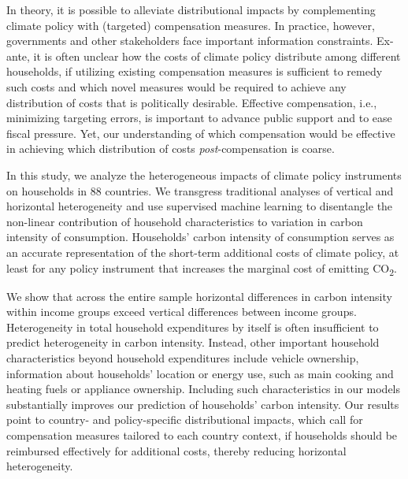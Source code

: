 \documentclass[12pt, a4paper]{article}
\begin{document}
In theory, it is possible to alleviate distributional impacts by complementing climate policy with (targeted) compensation measures. In practice, however, governments and other stakeholders face important information constraints. Ex-ante, it is often unclear how the costs of climate policy distribute among different households, if utilizing existing compensation measures is sufficient to remedy such costs and which novel measures would be required to achieve any distribution of costs that is politically desirable. Effective compensation, i.e., minimizing targeting errors, is important to advance public support and to ease fiscal pressure. Yet, our understanding of which compensation would be effective in achieving which distribution of costs \textit{post}-compensation is coarse.

In this study, we analyze the heterogeneous impacts of climate policy instruments on households in 88 countries. We transgress traditional analyses of vertical and horizontal heterogeneity and use supervised machine learning to disentangle the non-linear contribution of household characteristics to variation in carbon intensity of consumption. Households' carbon intensity of consumption serves as an accurate representation of the short-term additional costs of climate policy, at least for any policy instrument that increases the marginal cost of emitting CO\textsubscript{2}.

We show that across the entire sample horizontal differences in carbon intensity within income groups exceed vertical differences between income groups. Heterogeneity in total household expenditures by itself is often insufficient to predict heterogeneity in carbon intensity. Instead, other important household characteristics beyond household expenditures include vehicle ownership, information about households' location or energy use, such as main cooking and heating fuels or appliance ownership. Including such characteristics in our models substantially improves our prediction of households' carbon intensity. Our results point to country- and policy-specific distributional impacts, which call for compensation measures tailored to each country context, if households should be reimbursed effectively for additional costs, thereby reducing horizontal heterogeneity. 
\end{document}
